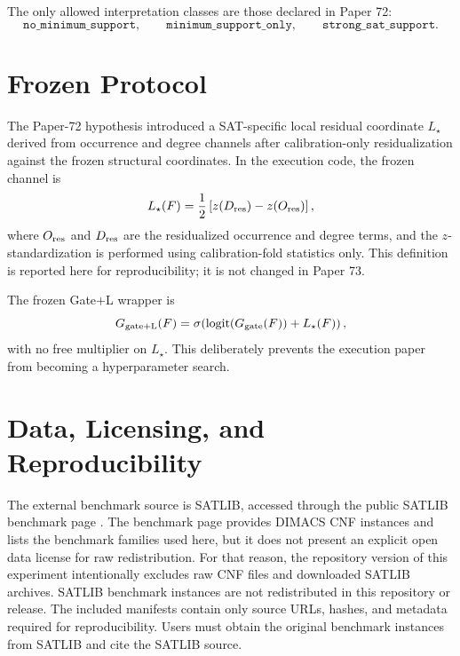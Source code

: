 \documentclass[11pt,a4paper]{article}
\newcommand{\Lstar}{L_\star}
\newcommand{\Ggate}{G_{\rm gate}}
\newcommand{\Glocal}{G_{\rm gate+L}}
\begin{document}
The only allowed interpretation classes are those declared in Paper 72:
\[
\texttt{no\_minimum\_support},\qquad
\texttt{minimum\_support\_only},\qquad
\texttt{strong\_sat\_support}.
\]

\section{Frozen Protocol}

The Paper-72 hypothesis introduced a SAT-specific local residual coordinate
$\Lstar$ derived from occurrence and degree channels after calibration-only
residualization against the frozen structural coordinates. In the execution
code, the frozen channel is
\begin{equation}
  \Lstar(F)
  =
  \frac{1}{2}\left[z(D_{\rm res})-z(O_{\rm res})\right],
  \label{eq:lstar}
\end{equation}
where $O_{\rm res}$ and $D_{\rm res}$ are the residualized occurrence and
degree terms, and the $z$-standardization is performed using calibration-fold
statistics only. This definition is reported here for reproducibility; it is
not changed in Paper 73.

The frozen Gate+L wrapper is
\begin{equation}
  \Glocal(F)
  =
  \sigma\!\left(
    \operatorname{logit}(\Ggate(F))+\Lstar(F)
  \right),
  \label{eq:gateplusl}
\end{equation}
with no free multiplier on $\Lstar$. This deliberately prevents the execution
paper from becoming a hyperparameter search.

\section{Data, Licensing, and Reproducibility}

The external benchmark source is SATLIB, accessed through the public SATLIB
benchmark page \cite{satlib}. The benchmark page provides DIMACS CNF instances
and lists the benchmark families used here, but it does not present an explicit
open data license for raw redistribution. For that reason, the repository
version of this experiment intentionally excludes raw CNF files and downloaded
SATLIB archives.
SATLIB benchmark instances are not redistributed in this repository or release.
The included manifests contain only source URLs, hashes, and metadata required
for reproducibility. Users must obtain the original benchmark instances from
SATLIB and cite the SATLIB source.
\end{document}
